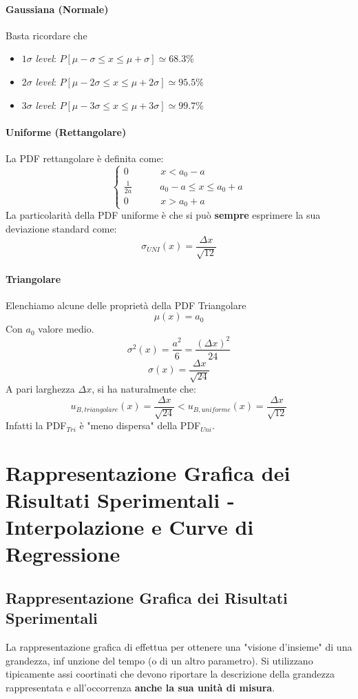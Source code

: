 \documentclass[a4paper,11pt]{report}
\begin{document}
\subsubsection{Gaussiana (Normale)}
Basta ricordare che
\begin{center}
\begin{itemize}
  \item $1\sigma$ \textit{level}: $P[\mu-\sigma \le x \le \mu+\sigma] \simeq 68.3\%$
  \item $2\sigma$ \textit{level}: $P[\mu-2\sigma \le x \le \mu+2\sigma] \simeq 95.5\%$
    \item $3\sigma$ \textit{level}: $P[\mu-3\sigma \le x \le \mu+3\sigma] \simeq 99.7\%$
\end{itemize}  
\end{center}
\subsubsection{Uniforme (Rettangolare)}
La PDF rettangolare è definita come:
\begin{equation}
   \begin{cases}
   0~~~~~~~~~~~~~~~x < a_0 -a\\
   \frac{1}{2a}~~~~~~~~~~~~~a_0 -a \le x \le a_0 + a\\
   0~~~~~~~~~~~~~~~x > a_0 +a
   \end{cases}
\end{equation}
La particolarità della PDF uniforme è che si può \textbf{sempre} esprimere la sua deviazione standard come:
$$
  \sigma_{UNI}(x) = \frac{\Delta x}{\sqrt{12}}
$$
\subsubsection{Triangolare}
Elenchiamo alcune delle proprietà della PDF Triangolare
$$
  \mu(x) = a_0
$$
Con $a_0$ valore medio.
$$
  \sigma^2(x) = \frac{a^2}{6} = \frac{(\Delta x)^2}{24}
$$
$$
  \sigma(x) = \frac{\Delta x}{\sqrt{24}}
$$
A pari larghezza $\Delta x$, si ha naturalmente che:
$$
  u_{B,triangolare}(x) = \frac{\Delta x}{\sqrt{24}} < u_{B,uniforme}(x) = \frac{\Delta x}{\sqrt{12}}
$$
Infatti la PDF$_{Tri}$ è "meno dispersa" della PDF$_{Uni}$.
\chapter{Rappresentazione Grafica dei Risultati Sperimentali - Interpolazione e Curve di Regressione}
\section{Rappresentazione Grafica dei Risultati Sperimentali}
La rappresentazione grafica di effettua per ottenere una "visione d'insieme" di una grandezza, inf unzione del tempo (o di un altro parametro). Si utilizzano tipicamente assi coortinati che devono riportare la descrizione della grandezza rappresentata e all'occorrenza \textbf{anche la sua unità di misura}.
\end{document}
